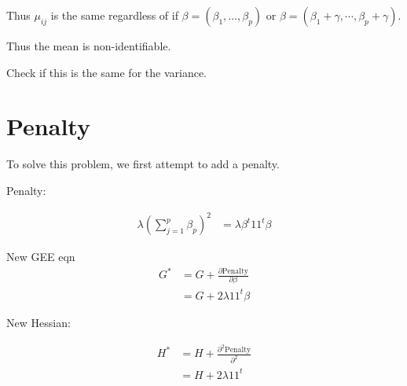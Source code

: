 \documentclass[10pt]{article}
\theoremstyle{definition}
\begin{document}
Thus $\mu_{ij}$ is the same regardless of if $\beta = (\beta_1, \ldots, \beta_p)$ or $\beta = (\beta_1 + \gamma, \cdots , \beta_p + \gamma)$.

Thus the mean is non-identifiable.

Check if this is the same for the variance.

\newpage
\section{Penalty}

To solve this problem, we first attempt to add a penalty.

Penalty:

\begin{align*}
  \lambda \left(\sum_{j=1}^p \beta_p \right)^2 &= \lambda \beta^t 1 1^t \beta
\end{align*}

New GEE eqn
\begin{align*}
 G^* &= G + \frac{\partial \text{Penalty}}{\partial \beta} \\
 &= G + 2\lambda 1 1^t \beta
\end{align*}

 New Hessian:

 \begin{align*}
   H^* &= H + \frac{\partial ^2 \text{Penalty}}{\partial ^2 } \\
   &= H + 2 \lambda 1 1^t
 \end{align*}


\newpage
\printbibliography
\end{document}

